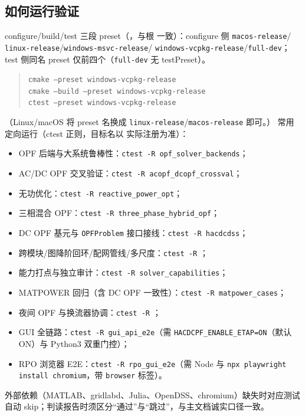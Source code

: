 \subsection{如何运行验证}
configure/build/test 三段 preset（，与根
 一致）：configure 侧 \texttt{macos-release}/
\texttt{linux-release}/\texttt{windows-msvc-release}/
\texttt{windows-vcpkg-release}/\texttt{full-dev}；test 侧同名 preset
仅前四个（\texttt{full-dev} 无 testPreset）。
\begin{quote}\footnotesize
\texttt{cmake --preset windows-vcpkg-release}\\
\texttt{cmake --build --preset windows-vcpkg-release}\\
\texttt{ctest --preset windows-vcpkg-release}
\end{quote}
（Linux/macOS 将 preset 名换成 \texttt{linux-release}/\texttt{macos-release} 即可。）
常用定向运行（ctest 正则，目标名以  实际注册为准）：
\begin{itemize}
  \item OPF 后端与大系统鲁棒性：\texttt{ctest -R opf\_solver\_backends}；
  \item AC/DC OPF 交叉验证：\texttt{ctest -R acopf\_dcopf\_crossval}；
  \item 无功优化：\texttt{ctest -R reactive\_power\_opt}；
  \item 三相混合 OPF：\texttt{ctest -R three\_phase\_hybrid\_opf}；
  \item DC OPF 基元与 \texttt{OPFProblem} 接口接线：\texttt{ctest -R hacdcdss}；
  \item 跨模块/图降阶回环/配网管线/多尺度：\texttt{ctest -R}
        ；
  \item 能力打点与独立审计：\texttt{ctest -R solver\_capabilities}；
  \item MATPOWER 回归（含 DC OPF 一致性）：\texttt{ctest -R matpower\_cases}；
  \item 夜间 OPF 与换流器协调：\texttt{ctest -R}
        ；
  \item GUI 全链路：\texttt{ctest -R gui\_api\_e2e}（需
        \texttt{HACDCPF\_ENABLE\_ETAP=ON}（默认 ON）与 Python3 双重门控）；
  \item RPO 浏览器 E2E：\texttt{ctest -R rpo\_gui\_e2e}（需 Node 与
        \texttt{npx playwright install chromium}，带 \texttt{browser} 标签）。
\end{itemize}
外部依赖（MATLAB、gridlabd、Julia、OpenDSS、chromium）缺失时对应测试自动
skip；判读报告时须区分“通过”与“跳过”，与主文档诚实口径一致。
